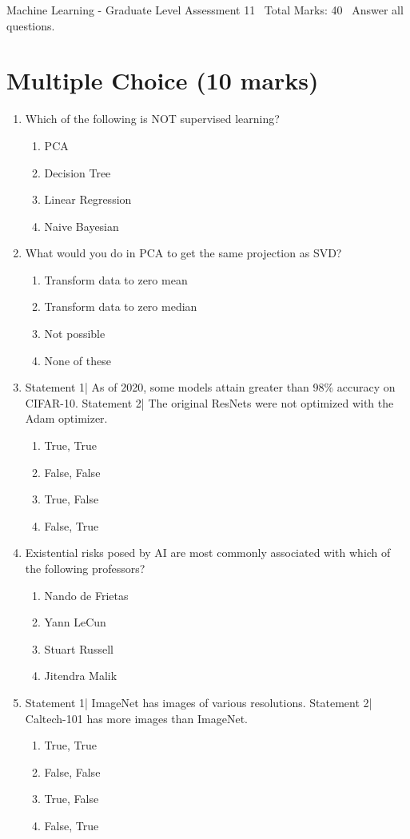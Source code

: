 \documentclass[12pt]{article}
\begin{document}
\begin{center}
Machine Learning - Graduate Level Assessment 11 \
Total Marks: 40 \
Answer all questions.
\end{center}

\section*{Multiple Choice (10 marks)}
\begin{enumerate}[label=\arabic*.]
\item Which of the following is NOT supervised learning?
\begin{enumerate}[label=(\alph*)]
    \item PCA
    \item Decision Tree
    \item Linear Regression
    \item Naive Bayesian
\end{enumerate}
\item What would you do in PCA to get the same projection as SVD?
\begin{enumerate}[label=(\alph*)]
    \item Transform data to zero mean
    \item Transform data to zero median
    \item Not possible
    \item None of these
\end{enumerate}
\item Statement 1| As of 2020, some models attain greater than 98\% accuracy on CIFAR-10. Statement 2| The original ResNets were not optimized with the Adam optimizer.
\begin{enumerate}[label=(\alph*)]
    \item True, True
    \item False, False
    \item True, False
    \item False, True
\end{enumerate}
\item Existential risks posed by AI are most commonly associated with which of the following professors?
\begin{enumerate}[label=(\alph*)]
    \item Nando de Frietas
    \item Yann LeCun
    \item Stuart Russell
    \item Jitendra Malik
\end{enumerate}
\item Statement 1| ImageNet has images of various resolutions. Statement 2| Caltech-101 has more images than ImageNet.
\begin{enumerate}[label=(\alph*)]
    \item True, True
    \item False, False
    \item True, False
    \item False, True
\end{enumerate}
\end{enumerate}
\end{document}
